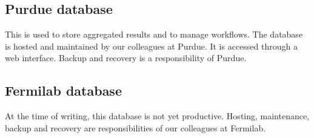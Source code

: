 \documentclass[12pt]{unlsilabsop}
\begin{document}
\subsection{Purdue database}
This is used to store aggregated results and to manage workflows. The database is hosted and maintained by our colleagues at Purdue. It is accessed through a web interface. Backup and recovery is a responsibility of Purdue.

\subsection{Fermilab database}
At the time of writing, this database is not yet productive. Hosting, maintenance, backup and recovery are responsibilities of our colleagues at Fermilab.
\end{document}
